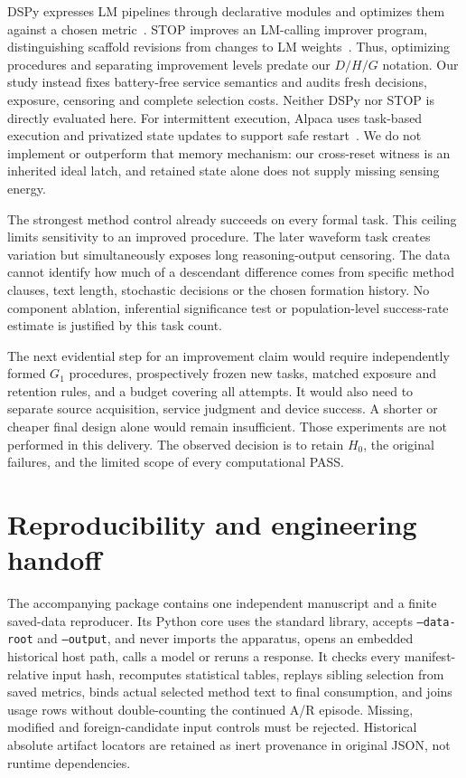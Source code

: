 DSPy expresses LM pipelines through declarative modules and optimizes them
against a chosen metric~\cite{khattab2023}. STOP improves an LM-calling
improver program, distinguishing scaffold revisions from changes to LM
weights~\cite{zelikman2024}. Thus, optimizing procedures and separating
improvement levels predate our $D/H/G$ notation. Our study instead fixes
battery-free service semantics and audits fresh decisions, exposure, censoring
and complete selection costs. Neither DSPy nor STOP is directly evaluated here.
For intermittent execution, Alpaca uses task-based execution and privatized
state updates to support safe restart~\cite{maeng2017}. We do not implement
or outperform that memory mechanism: our cross-reset witness is an inherited
ideal latch, and retained state alone does not supply missing sensing energy.

The strongest method control already succeeds on every formal task. This
ceiling limits sensitivity to an improved procedure. The later waveform task
creates variation but simultaneously exposes long reasoning-output censoring.
The data cannot identify how much of a descendant difference comes from
specific method clauses, text length, stochastic decisions or the chosen
formation history. No component ablation, inferential significance test or
population-level success-rate estimate is justified by this task count.

The next evidential step for an improvement claim would require independently
formed $G_1$ procedures, prospectively frozen new tasks, matched exposure and
retention rules, and a budget covering all attempts. It would also need to
separate source acquisition, service judgment and device success. A shorter
or cheaper final design alone would remain insufficient. Those experiments
are not performed in this delivery. The observed decision is to retain $H_0$,
the original failures, and the limited scope of every computational PASS.

\section{Reproducibility and engineering handoff}
The accompanying package contains one independent manuscript and a finite
saved-data reproducer. Its Python core uses the standard library, accepts
\texttt{--data-root} and \texttt{--output}, and never imports the apparatus,
opens an embedded historical host path, calls a model or reruns a response.
It checks every manifest-relative input hash, recomputes statistical tables,
replays sibling selection from saved metrics, binds actual selected method
text to final consumption, and joins usage rows without double-counting the
continued A/R episode. Missing, modified and foreign-candidate input controls
must be rejected. Historical absolute artifact locators are retained as inert
provenance in original JSON, not runtime dependencies.

